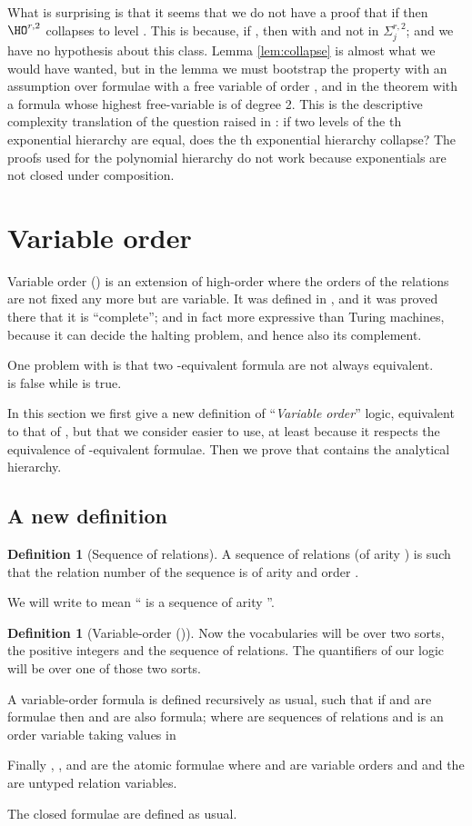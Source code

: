 \documentclass[a4paper,12pt]{article}
\newcommand{\emphdex}[1]{\index{#1}\emph{#1}}
\theoremstyle{definition}
\newtheorem{definition}[theorem]{Definition}
\newcommand{\hod}[2]{\ensuremath{\HO^{#1,#2}}}
\newcommand{\hoc}[3]{\ensuremath{\Sigma^{#1,#3}_{#2}}}
\newcommand{\eh}[1]{th exponential hierarchy}
\begin{document}
What is surprising is that it seems that we do not have a proof that if
 then \hod{r}{2} collapses to level
. This is because, if , then  with  and not in \hoc r{j}2; and we
have no hypothesis about this class.  Lemma \ref{lem:collapse} is
almost what we would have wanted, but in the lemma we must bootstrap
the property with an assumption over formulae with a free variable of
order , and in the theorem with a formula whose highest
free-variable is of degree 2. This is the descriptive complexity
translation of the question raised in \cite{sky}: if two levels of the
\eh r are equal, does the \eh r collapse? The proofs used for the
polynomial hierarchy do not work because exponentials are not closed
under composition.

\section{Variable order}\label{vo}
Variable order (\VO{}) is an extension of high-order where the orders
of the relations are not fixed any more but are variable. It was defined
in \cite{lauri}, and it was proved there that it is ``complete''; and in
fact more expressive than Turing machines, because it can decide the
halting problem, and hence also its complement.

One problem with \VO{} is that two -equivalent formula are not
always equivalent. \\ is false while  is true.

In this section we first give a new definition of
``\emphdex{Variable order}'' logic, equivalent to that of
\cite{lauri}, but that we consider easier to use, at least because it
respects the equivalence of -equivalent formulae.  Then we
prove that \VO{} contains the analytical hierarchy.

\subsection{A new definition}


\begin{definition}[Sequence of relations]
  A sequence of relations (of arity ) is such that the relation
  number  of the sequence is of arity  and order .

  We will write  to
  mean `` is a sequence of arity ''.
\end{definition}
\begin{definition}[Variable-order (\VO{})]Now the vocabularies will be
  over two sorts, the positive integers and the sequence of relations.
  The quantifiers of our logic will be over one of those two
    sorts.

  A variable-order formula  is defined recursively as usual,
  such that if  and  are formulae then  and  are also
  formula; where  are sequences of relations and  is an
  order variable taking values in 

  Finally , ,  and  are the atomic formulae where 
  and  are variable orders and  and the  are
  untyped relation variables.

  The closed formulae are defined as usual.
\end{definition}
\end{document}
